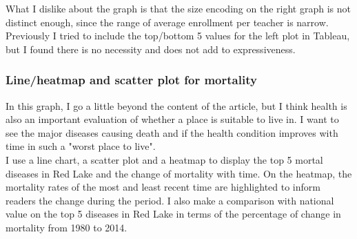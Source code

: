 \documentclass{article}
\begin{document}
\noindent
What I dislike about the graph is that the size encoding on the right graph is not distinct enough, since the range of average enrollment per teacher is narrow. \\
\noindent
Previously I tried to include the top/bottom 5 values for the left plot in Tableau, but I found there is no necessity and does not add to expressiveness. \\


\newpage
\subsubsection*{Line/heatmap and scatter plot for mortality}

In this graph, I go a little beyond the content of the article, but I think health is also an important evaluation of whether a place is suitable to live in. I want to see the major diseases causing death and if the health condition improves with time in such a "worst place to live". \\
\noindent
I use a line chart, a scatter plot and a heatmap to display the top 5 mortal diseases in Red Lake and the change of mortality with time. On the heatmap, the mortality rates of the most and least recent time are highlighted to inform readers the change during the period. I also make a comparison with national value on the top 5 diseases in Red Lake in terms of the percentage of change in mortality from 1980 to 2014. \\
\end{document}
